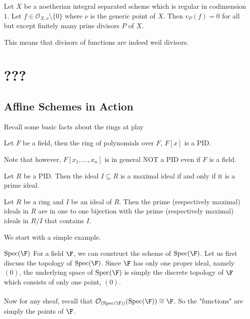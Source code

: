 \documentclass[a4paper]{article}
\begin{document}
\begin{lmm}{}{} Let $X$ be a noetherian integral separated scheme which is regular in codimension $1$. Let $f\in\mathcal{O}_{X,\nu}\setminus\{0\}$ where $\nu$ is the generic point of $X$. Then $v_P(f)=0$ for all but except finitely many prine divisors $P$ of $X$. 
\end{lmm}

This means that divisors of functions are indeed weil divisors. 


\pagebreak
\section{???}

\subsection{Affine Schemes in Action}
Recall some basic facts about the rings at play
\begin{prp}{}{} Let $F$ be a field, then the ring of polynomials over $F$, $F[x]$ is a PID. 
\end{prp}

Note that however, $F[x_1,\dots,x_n]$ is in general NOT a PID even if $F$ is a field. 

\begin{prp}{}{} Let $R$ be a PID. Then the ideal $I\subseteq R$ is a maximal ideal if and only if it is a prime ideal. 
\end{prp}

\begin{prp}{}{} Let $R$ be a ring and $I$ be an ideal of $R$. Then the prime (respectively maximal) ideals in $R$ are in one to one bijection with the prime (respectively maximal) ideals in $R/I$ that contains $I$. 
\end{prp}

We start with a simple example. 

\begin{eg}{$\text{Spec}(\F)$}{} For a field $\F$, we can construct the scheme of $\text{Spec}(\F)$.  Let us first discuss the topology of $\text{Spec}(\F)$. Since $\F$ has only one proper ideal, namely $(0)$, the underlying space of $\text{Spec}(\F)$ is simply the discrete topology of $\F$ which consists of only one point, $(0)$. \\~\\
Now for any sheaf, recall that $\mathcal{O}_{(\text{Spec}(\F))}(\text{Spec}(\F))\cong\F$. So the "functions" are simply the points of $\F$. 
\end{eg}
\end{document}

